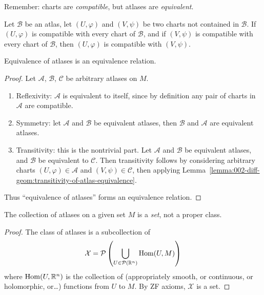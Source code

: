 \begin{remark}
  Remember: charts are \emph{compatible}, but atlases are \emph{equivalent}.
\end{remark}

\begin{lemma}\label{lemma:002-diff-geom:transitivity-of-atlas-equivalence}
  Let $\mathcal{B}$ be an atlas, let $(U,\varphi)$ and $(V,\psi)$ be two
  charts not contained in $\mathcal{B}$.
  If $(U,\varphi)$ is compatible with every chart of $\mathcal{B}$, and
  if $(V,\psi)$ is compatible with every chart of $\mathcal{B}$,
  then $(U,\varphi)$ is compatible with $(V,\psi)$.
\end{lemma}

\begin{theorem}
  Equivalence of atlases is an equivalence relation.
\end{theorem}

\begin{proof}
  Let $\mathcal{A}$, $\mathcal{B}$, $\mathcal{C}$ be arbitrary atlases on $M$.
  \begin{enumerate}
  \item Reflexivity: $\mathcal{A}$ is equivalent to itself, since by
    definition any pair of charts in $\mathcal{A}$ are compatible.
  \item Symmetry: let $\mathcal{A}$ and $\mathcal{B}$ be equivalent
    atlases, then $\mathcal{B}$ and $\mathcal{A}$ are equivalent atlases.
  \item Transitivity: this is the nontrivial part. Let $\mathcal{A}$ and
    $\mathcal{B}$ be equivalent atlases, and $\mathcal{B}$ be equivalent
    to $\mathcal{C}$. Then transitivity follows by considering arbitrary charts
    $(U,\varphi)\in\mathcal{A}$ and $(V,\psi)\in\mathcal{C}$, then
    applying Lemma~\ref{lemma:002-diff-geom:transitivity-of-atlas-equivalence}.
  \end{enumerate}
  Thus ``equivalence of atlases'' forms an equivalence relation.
\end{proof}

\begin{proposition}
The collection of atlases on a given set $M$ is a \emph{set}, not a
proper class.
\end{proposition}
\begin{proof}
  The class of atlases is a subcollection of
  \begin{equation}
    \mathcal{X}=\mathcal{P}\left(\bigcup_{U\in\mathcal{P}(\mathbb{R}^{n})}\mathop{\rm Hom}\nolimits(U,M)\right)
  \end{equation}
  where $\mathop{\rm Hom}\nolimits(U,\mathbb{R}^{n})$ is the collection of (appropriately smooth, or
  continuous, or holomorphic, or\dots) functions from $U$ to $M$. By ZF
  axioms, $\mathcal{X}$ is a set.
\end{proof}

